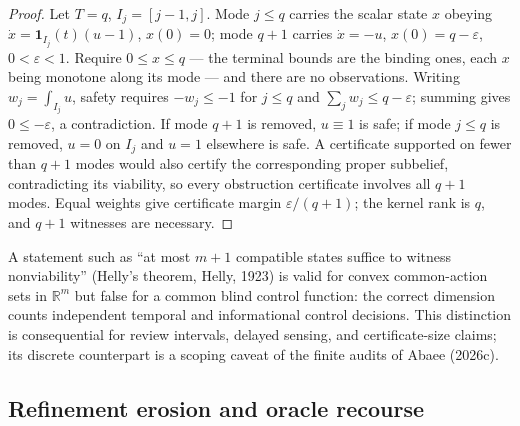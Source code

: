 \documentclass[10pt,twocolumn]{article}
\theoremstyle{plain}
\theoremstyle{definition}
\theoremstyle{remark}
\begin{document}
\begin{proof}
Let \(T = q\), \(I_j = [j-1, j]\). Mode \(j \le q\) carries the scalar state \(x\) obeying
\(\dot x = \mathbf{1}_{I_j}(t)(u - 1)\), \(x(0) = 0\); mode \(q+1\)
carries \(\dot x = -u\), \(x(0) = q - \varepsilon\), \(0 < \varepsilon
< 1\). Require \(0 \le x \le q\) --- the terminal bounds are the binding
ones, each \(x\) being monotone along its mode --- and there are no
observations. Writing
\(w_j = \int_{I_j} u\), safety requires \(-w_j \le -1\) for \(j \le q\) and
\(\sum_j w_j \le q - \varepsilon\); summing gives \(0 \le -\varepsilon\), a
contradiction. If mode \(q+1\) is removed, \(u \equiv 1\) is safe; if mode
\(j \le q\) is removed, \(u = 0\) on \(I_j\) and \(u = 1\) elsewhere is
safe. A certificate supported on fewer than \(q+1\) modes would also
certify the corresponding proper subbelief, contradicting its viability, so
every obstruction certificate involves all \(q+1\) modes. Equal weights give certificate margin \(\varepsilon/(q+1)\); the
kernel rank is \(q\), and \(q+1\) witnesses are necessary.
\end{proof}

A statement such as ``at most \(m+1\) compatible states suffice to witness
nonviability'' (Helly's theorem, Helly, 1923) is valid for convex common-action sets in \(\mathbb{R}^m\) but
false for a common blind control function: the correct dimension counts
independent temporal and informational control decisions. This distinction
is consequential for review intervals, delayed sensing, and
certificate-size claims; its discrete counterpart is a scoping caveat of the
finite audits of Abaee (2026c).

\subsection{Refinement erosion and oracle recourse}\label{erosion}
\end{document}
